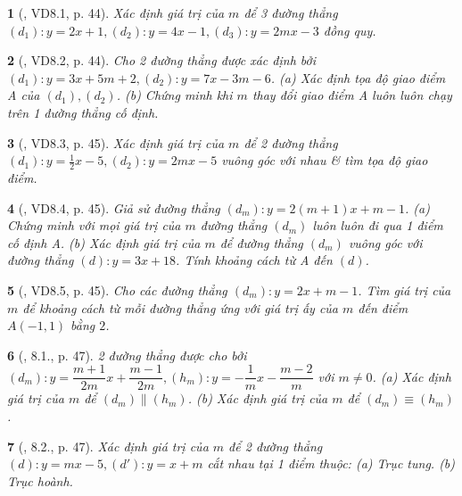 \documentclass{article}
\newtheorem{baitoan}{}
\begin{document}
\begin{baitoan}[\cite{TLCT_THCS_Toan_9_dai_so}, VD8.1, p. 44]
	Xác định giá trị của $m$ để 3 đường thẳng $(d_1):y = 2x + 1,(d_2):y = 4x - 1,(d_3):y = 2mx - 3$ đồng quy.
\end{baitoan}

\begin{baitoan}[\cite{TLCT_THCS_Toan_9_dai_so}, VD8.2, p. 44]
	Cho 2 đường thẳng được xác định bởi $(d_1):y = 3x + 5m + 2,(d_2):y = 7x - 3m - 6$. (a) Xác định tọa độ giao điểm A của $(d_1),(d_2)$. (b) Chứng minh khi $m$ thay đổi giao điểm A luôn luôn chạy trên 1 đường thẳng cố định.
\end{baitoan}

\begin{baitoan}[\cite{TLCT_THCS_Toan_9_dai_so}, VD8.3, p. 45]
	Xác định giá trị của $m$ để 2 đường thẳng $(d_1):y = \frac{1}{2}x - 5,(d_2):y = 2mx - 5$ vuông góc với nhau \& tìm tọa độ giao điểm.
\end{baitoan}

\begin{baitoan}[\cite{TLCT_THCS_Toan_9_dai_so}, VD8.4, p. 45]
	Giả sử đường thẳng $(d_m):y = 2(m + 1)x + m - 1$. (a) Chứng minh với mọi giá trị của $m$ đường thẳng $(d_m)$ luôn luôn đi qua 1 điểm cố định A. (b) Xác định giá trị của $m$ để đường thẳng $(d_m)$ vuông góc với đường thẳng $(d):y = 3x + 18$. Tính khoảng cách từ A đến $(d)$.
\end{baitoan}

\begin{baitoan}[\cite{TLCT_THCS_Toan_9_dai_so}, VD8.5, p. 45]
	Cho các đường thẳng $(d_m):y = 2x + m - 1$. Tìm giá trị của $m$ để khoảng cách từ mỗi đường thẳng ứng với giá trị ấy của $m$ đến điểm $A(-1,1)$ bằng $2$.
\end{baitoan}

\begin{baitoan}[\cite{TLCT_THCS_Toan_9_dai_so}, 8.1., p. 47]
	2 đường thẳng được cho bởi $(d_m):y = \dfrac{m + 1}{2m}x + \dfrac{m - 1}{2m},(h_m):y = -\dfrac{1}{m}x - \dfrac{m - 2}{m}$ với $m\ne0$. (a) Xác định giá trị của $m$ để $(d_m)\parallel(h_m)$. (b) Xác định giá trị của $m$ để $(d_m)\equiv(h_m)$.
\end{baitoan}

\begin{baitoan}[\cite{TLCT_THCS_Toan_9_dai_so}, 8.2., p. 47]
	Xác định giá trị của $m$ để 2 đường thẳng $(d):y = mx - 5,(d'):y = x + m$ cắt nhau tại 1 điểm thuộc: (a) Trục tung. (b) Trục hoành.
\end{baitoan}
\end{document}

